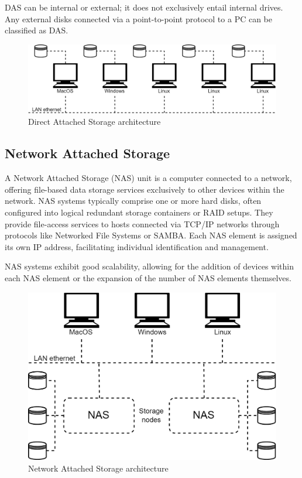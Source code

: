 DAS can be internal or external; it does not exclusively entail internal drives. 
Any external disks connected via a point-to-point protocol to a PC can be classified as DAS.\@
\begin{figure}[H]
    \centering
    \includegraphics[width=0.75\linewidth]{images/das.png}
    \caption{Direct Attached Storage architecture}
\end{figure}


\subsection{Network Attached Storage}
A Network Attached Storage (NAS) unit is a computer connected to a network, offering file-based data storage services exclusively to other devices within the network. 
NAS systems typically comprise one or more hard disks, often configured into logical redundant storage containers or RAID setups. 
They provide file-access services to hosts connected via TCP/IP networks through protocols like Networked File Systems or SAMBA.\@ 
Each NAS element is assigned its own IP address, facilitating individual identification and management.

NAS systems exhibit good scalability, allowing for the addition of devices within each NAS element or the expansion of the number of NAS elements themselves.
\begin{figure}[H]
    \centering
    \includegraphics[width=0.6\linewidth]{images/nas.png}
    \caption{Network Attached Storage architecture}
\end{figure}

